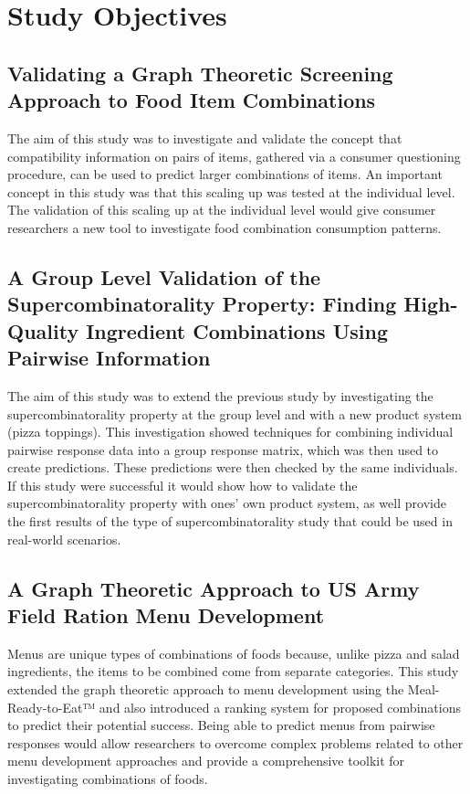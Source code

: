 \chapter{Study Objectives}
\section{Validating a Graph Theoretic Screening Approach to Food Item Combinations}

The aim of this study was to investigate and validate the concept that compatibility information on pairs of items, gathered via a consumer questioning procedure, can be used to predict larger combinations of items.  An important concept in this study was that this scaling up was tested at the individual level.  The validation of this scaling up at the individual level would give consumer researchers a new tool to investigate food combination consumption patterns.

\section{A Group Level Validation of the Supercombinatorality Property: Finding High-Quality Ingredient Combinations Using Pairwise Information}
The aim of this study was to extend the previous study by investigating the supercombinatorality property at the group level and with a new product system (pizza toppings).  This investigation showed techniques for combining individual pairwise response data into a group response matrix, which was then used to create predictions. These predictions were then checked by the same individuals.  If this study were successful it would show how to validate the supercombinatorality property with ones’ own product system, as well provide the first results of the type of supercombinatorality study that could be used in real-world scenarios.  
\section{A Graph Theoretic Approach to US Army Field Ration Menu Development}
Menus are unique types of combinations of foods because, unlike pizza and salad ingredients, the items to be combined come from separate categories.  This study extended the graph theoretic approach to menu development using the Meal-Ready-to-Eat™ and also introduced a ranking system for proposed combinations to predict their potential success.  Being able to predict menus from pairwise responses would allow researchers to overcome complex problems related to other menu development approaches and provide a comprehensive toolkit for investigating combinations of foods.